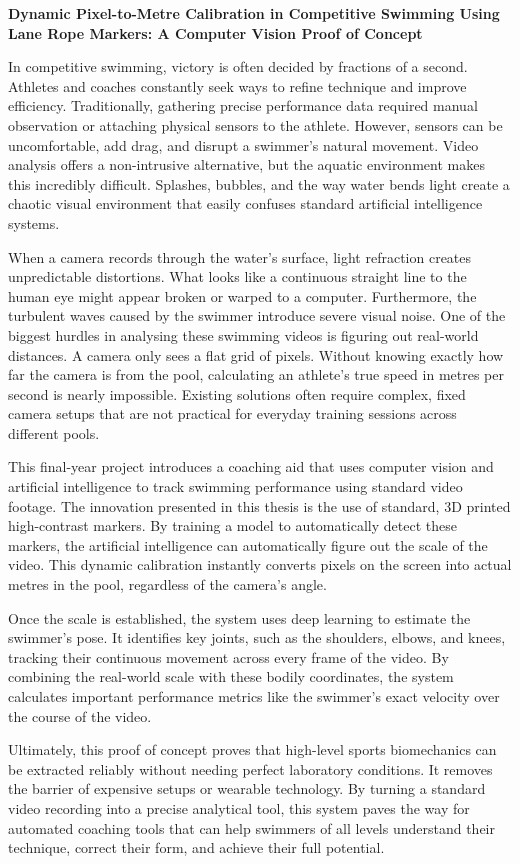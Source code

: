 \documentclass[11pt, a4paper]{article}
\begin{document}
{\noindent \LARGE \textbf{Dynamic Pixel-to-Metre Calibration in Competitive Swimming Using Lane Rope Markers: A Computer Vision Proof of Concept}}
\vspace{0.5cm}

In competitive swimming, victory is often decided by fractions of a second. Athletes and coaches constantly seek ways to refine technique and improve efficiency. Traditionally, gathering precise performance data required manual observation or attaching physical sensors to the athlete. However, sensors can be uncomfortable, add drag, and disrupt a swimmer's natural movement. Video analysis offers a non-intrusive alternative, but the aquatic environment makes this incredibly difficult. Splashes, bubbles, and the way water bends light create a chaotic visual environment that easily confuses standard artificial intelligence systems.

When a camera records through the water's surface, light refraction creates unpredictable distortions. What looks like a continuous straight line to the human eye might appear broken or warped to a computer. Furthermore, the turbulent waves caused by the swimmer introduce severe visual noise. One of the biggest hurdles in analysing these swimming videos is figuring out real-world distances. A camera only sees a flat grid of pixels. Without knowing exactly how far the camera is from the pool, calculating an athlete's true speed in metres per second is nearly impossible. Existing solutions often require complex, fixed camera setups that are not practical for everyday training sessions across different pools.

This final-year project introduces a coaching aid that uses computer vision and artificial intelligence to track swimming performance using standard video footage. The innovation presented in this thesis is the use of standard, 3D printed high-contrast markers. By training a model to automatically detect these markers, the artificial intelligence can automatically figure out the scale of the video. This dynamic calibration instantly converts pixels on the screen into actual metres in the pool, regardless of the camera's angle.

Once the scale is established, the system uses deep learning to estimate the swimmer's pose. It identifies key joints, such as the shoulders, elbows, and knees, tracking their continuous movement across every frame of the video. By combining the real-world scale with these bodily coordinates, the system calculates important performance metrics like the swimmer's exact velocity over the course of the video. 

Ultimately, this proof of concept proves that high-level sports biomechanics can be extracted reliably without needing perfect laboratory conditions. It removes the barrier of expensive setups or wearable technology. By turning a standard video recording into a precise analytical tool, this system paves the way for automated coaching tools that can help swimmers of all levels understand their technique, correct their form, and achieve their full potential.
\end{document}
